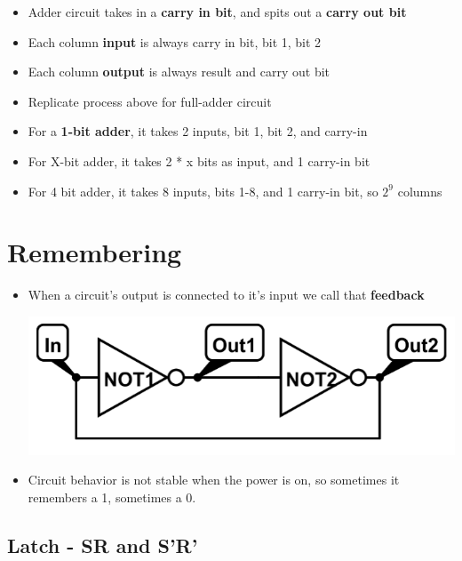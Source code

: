 \documentclass{article}
\begin{document}
\begin{itemize}
    \item Adder circuit takes in a \textbf{carry in bit}, and spits out a \textbf{carry out bit}
    
    \item Each column \textbf{input} is always carry in bit, bit 1, bit 2
    
    \item Each column \textbf{output} is always result and carry out bit
    
    \item Replicate process above for full-adder circuit
    
    \item For a \textbf{1-bit adder}, it takes 2 inputs, bit 1, bit 2, and carry-in 
    
    \item For X-bit adder, it takes 2 * x bits as input, and 1 carry-in bit
    
    \item For 4 bit adder, it takes 8 inputs, bits 1-8, and 1 carry-in bit, so $2^9$ columns
\end{itemize}
\section{Remembering}

\begin{itemize}
    \item When a circuit's output is connected to it's input we call that \textbf{feedback}
    
    \includegraphics[scale=0.35]{images/feedback.png}
    
    \item Circuit behavior is not stable when the power is on, so sometimes it remembers a 1, sometimes a 0.
    

\end{itemize}

\subsection{Latch - SR and S'R'}
\end{document}

